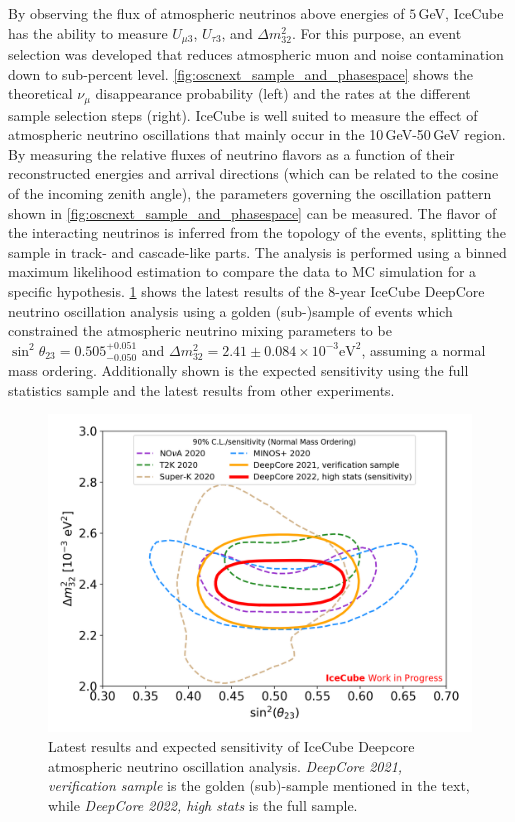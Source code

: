 \documentclass[a4paper,11pt]{article}
\begin{document}
By observing the flux of atmospheric neutrinos above energies of $5\,$GeV, IceCube has the ability to measure $U_{\mu3}$, $U_{\tau3}$, and $\Delta m^{2}_{32}$. For this purpose, an event selection was developed that reduces atmospheric muon and noise contamination down to sub-percent level. \cref{fig:oscnext_sample_and_phasespace} shows the theoretical $\nu_{\mu}$ disappearance probability (left) and the rates at the different sample selection steps (right). IceCube is well suited to measure the effect of atmospheric neutrino oscillations that mainly occur in the 10\,GeV-50\,GeV region. By measuring the relative fluxes of neutrino flavors as a function of their reconstructed energies and arrival directions (which can be related to the cosine of the incoming zenith angle), the parameters governing the oscillation pattern shown in \cref{fig:oscnext_sample_and_phasespace} can be measured. The flavor of the interacting neutrinos is inferred from the topology of the events, splitting the sample in track- and cascade-like parts. The analysis is performed using a binned maximum likelihood estimation to compare the data to MC simulation for a specific hypothesis. \cref{fig:oscnext_oscillations_results} shows the latest results of the 8-year IceCube DeepCore neutrino oscillation analysis using a golden (sub-)sample of events which constrained the atmospheric neutrino mixing parameters to be $\sin^2\theta_{23} = 0.505^{+0.051}_{-0.050}$ and $\Delta m^2_{32} = 2.41\pm0.084 \times 10^{-3}\mathrm{eV}^2$, assuming a normal mass ordering. Additionally shown is the expected sensitivity using the full statistics sample and the latest results from other experiments.

\begin{figure}[h!]
  \centering
  \includegraphics[height=0.4\linewidth]{figures/OscNext_numu_disappearance_sensitivity_public_v2.png}
  \caption{Latest results and expected sensitivity of IceCube Deepcore atmospheric neutrino oscillation analysis. \textit{DeepCore 2021, verification sample} is the golden (sub)-sample mentioned in the text, while \textit{DeepCore 2022, high stats} is the full sample.}
  \label{fig:oscnext_oscillations_results}
\end{figure}
\end{document}
